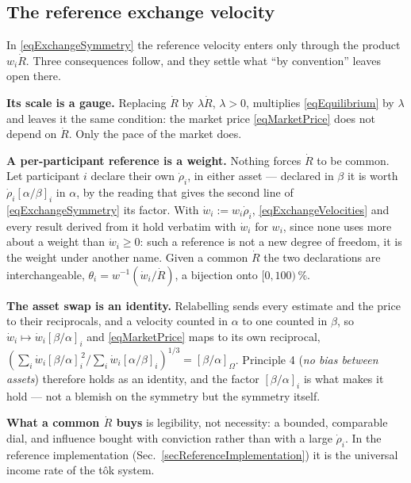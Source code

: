 \documentclass[letterpaper]{article}
\newcommand{\priceAB}{\left[\alpha / \beta\right]}
\newcommand{\priceBA}{\left[\beta / \alpha\right]}
\begin{document}
\subsection{The reference exchange velocity}\label{secReferenceGauge}

In \eqref{eqExchangeSymmetry} the reference velocity enters only through the product
$w_i \dot{R}$. Three consequences follow, and they settle what ``by convention'' leaves
open there.

\textbf{Its scale is a gauge.} Replacing $\dot{R}$ by $\lambda \dot{R}$, $\lambda > 0$,
multiplies \eqref{eqEquilibrium} by $\lambda$ and leaves it the same condition: the market
price \eqref{eqMarketPrice} does not depend on $\dot{R}$. Only the pace of the market does.

\textbf{A per-participant reference is a weight.} Nothing forces $\dot{R}$ to be common.
Let participant $i$ declare their own $\dot{\rho}_i$, in either asset --- declared in
$\beta$ it is worth $\dot{\rho}_i \priceAB_i$ in $\alpha$, by the reading that gives the
second line of \eqref{eqExchangeSymmetry} its factor. With $\dot{w}_i := w_i \dot{\rho}_i$,
\eqref{eqExchangeVelocities} and every result derived from it hold verbatim with
$\dot{w}_i$ for $w_i$, since none uses more about a weight than $\dot{w}_i \geq 0$: such a
reference is not a new degree of freedom, it is the weight under another name. Given a
common $\dot{R}$ the two declarations are interchangeable,
$\theta_i = w^{-1}(\dot{w}_i/\dot{R})$, a bijection onto $[0,100)\,\%$.

\textbf{The asset swap is an identity.} Relabelling sends every estimate and the price to
their reciprocals, and a velocity counted in $\alpha$ to one counted in $\beta$, so
$\dot{w}_i \mapsto \dot{w}_i \priceBA_i$ and \eqref{eqMarketPrice} maps to its own
reciprocal, $\left( \sum_i \dot{w}_i \priceBA_i^{\,2} \big/ \sum_i \dot{w}_i \priceAB_i
\right)^{1/3} = \priceBA_\Omega$. Principle 4 (\emph{no bias between assets}) therefore
holds as an identity, and the factor $\priceBA_i$ is what makes it hold --- not a blemish
on the symmetry but the symmetry itself.

\textbf{What a common $\dot{R}$ buys} is legibility, not necessity: a bounded, comparable
dial, and influence bought with conviction rather than with a large $\dot{\rho}_i$. In the
reference implementation (Sec.~\ref{secReferenceImplementation}) it is the universal income
rate of the t\^{o}k system.
\end{document}
